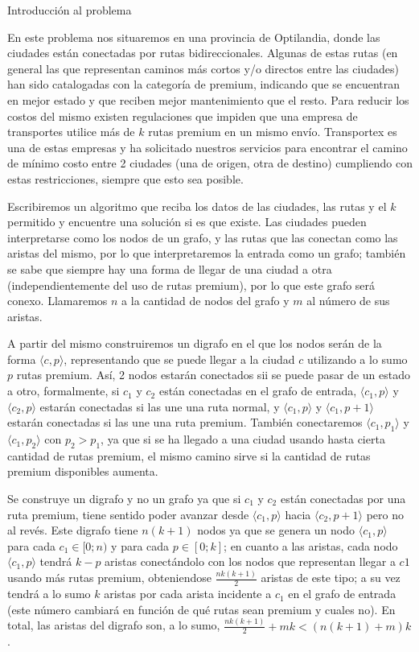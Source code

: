

\begin{subsection}{Introducción al problema}

En este problema nos situaremos en una provincia de Optilandia, donde las ciudades están conectadas por rutas bidireccionales. Algunas de estas rutas (en general las que representan caminos más cortos y/o directos entre las ciudades) han sido catalogadas con la categoría de premium, indicando que se encuentran en mejor estado y que reciben mejor mantenimiento que el resto. Para reducir los costos del mismo existen regulaciones que impiden que una empresa de transportes utilice más de $k$ rutas premium en un mismo envío. Transportex es una de estas empresas y ha solicitado nuestros servicios para encontrar el camino de mínimo costo entre 2 ciudades (una de origen, otra de destino) cumpliendo con estas restricciones, siempre que esto sea posible.

Escribiremos un algoritmo que reciba los datos de las ciudades, las rutas y el $k$ permitido y encuentre una solución si es que existe. Las ciudades pueden interpretarse como los nodos de un grafo, y las rutas que las conectan como las aristas del mismo, por lo que interpretaremos la entrada como un grafo; también se sabe que siempre hay una forma de llegar de una ciudad a otra (independientemente del uso de rutas premium), por lo que este grafo será conexo. Llamaremos $n$ a la cantidad de nodos del grafo y $m$ al número de sus aristas. 

A partir del mismo construiremos un digrafo en el que los nodos serán de la forma $\langle c, p \rangle$, representando que se puede llegar a la ciudad $c$ utilizando a lo sumo $p$ rutas premium. As\'{i}, 2 nodos estar\'{a}n conectados sii se puede pasar de un estado a otro, formalmente,  si $c_1$ y $c_2$ est\'{a}n conectadas en el grafo de entrada, $\langle c_1, p \rangle$ y $\langle c_2, p \rangle$ estar\'{a}n conectadas si las une una ruta normal, y $\langle c_1, p \rangle$ y $\langle c_1, p + 1\rangle$ estar\'{a}n conectadas si las une una ruta premium. Tambi\'{e}n conectaremos $\langle c_1, p_1 \rangle$ y $\langle c_1, p_2 \rangle$ con $p_2 > p_1$, ya que si se ha llegado a una ciudad usando hasta cierta cantidad de rutas premium, el mismo camino sirve si la cantidad de rutas premium disponibles aumenta.

Se construye un digrafo y no un grafo ya que si $c_1$ y $c_2$ est\'{a}n conectadas por una ruta premium, tiene sentido poder avanzar desde $\langle c_1, p \rangle$ hacia $\langle c_2, p+1 \rangle$ pero no al rev\'{e}s. Este digrafo tiene $n(k+1)$ nodos ya que se genera un nodo $\langle c_1, p \rangle$ para cada $c_1 \in [0; n)$ y para cada $p \in [0; k]$; en cuanto a las aristas, cada nodo $\langle c_1, p \rangle$ tendrá $k-p$ aristas conectándolo con los nodos que representan llegar a $c1$ usando más rutas premium, obteniendose $\frac{nk(k+1)}{2}$ aristas de este tipo; a su vez tendrá a lo sumo $k$ aristas por cada arista incidente a $c_1$ en el grafo de entrada (este número cambiará en función de qué rutas sean premium y cuales no). En total, las aristas del digrafo son, a lo sumo, $\frac{nk(k+1)}{2} + mk < (n(k+1)+m)k$.


\end{subsection}
